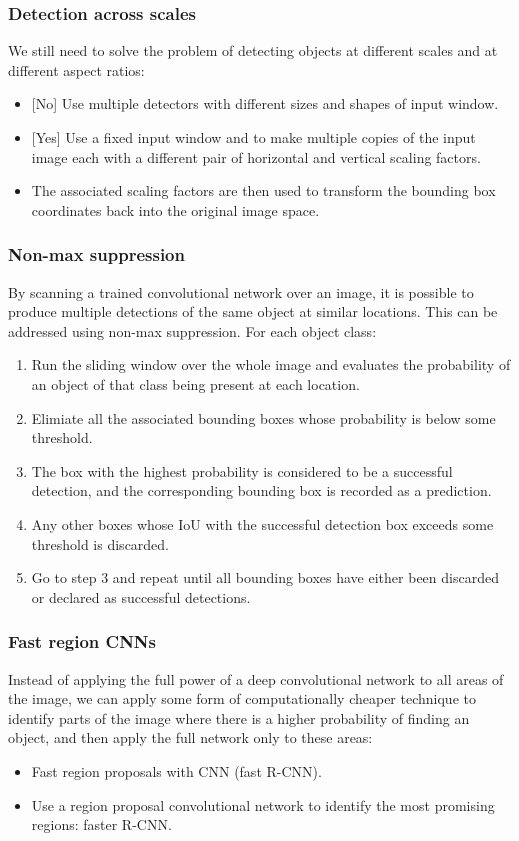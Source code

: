 \documentclass{beamer}
\begin{document}
\begin{frame}
    \frametitle{Detection across scales}
    We still need to solve the problem of detecting objects at different scales and at different aspect ratios:
    \begin{itemize}
        \item {[No]} Use multiple detectors with different sizes and shapes of input window.
        \item {[Yes]} Use a fixed input window and to make multiple copies of the input image each with a different pair of horizontal and vertical scaling factors.
        \item The associated scaling factors are then used to transform the bounding box coordinates back into the original image space.
    \end{itemize}
\end{frame}

\begin{frame}
    \frametitle{Non-max suppression}
    By scanning a trained convolutional network over an image, it is possible to produce multiple detections of the same object at similar locations. This can be addressed using non-max suppression. For each object class:
    \begin{enumerate}
        \item Run the sliding window over the whole image and evaluates the probability of an object of that class being present at each location.
        \item Elimiate all the associated bounding boxes whose probability is below some threshold.
        \item The box with the highest probability is considered to be a successful detection, and the corresponding bounding box is recorded as a prediction.
        \item Any other boxes whose IoU with the successful detection box exceeds some threshold is discarded.
        \item Go to step 3 and repeat until all bounding boxes have either been discarded or declared as successful detections.
    \end{enumerate}
\end{frame}

\begin{frame}
    \frametitle{Fast region CNNs}
    Instead of applying the full power of a deep convolutional network to all areas of the image, we can apply some form of computationally cheaper technique to identify parts of the image where there is a higher probability of finding an object, and then apply the full network only to these areas:
    \begin{itemize}
        \item Fast region proposals with CNN (fast R-CNN).
        \item Use a region proposal convolutional network to identify the most promising regions: faster R-CNN.
    \end{itemize}
\end{frame}
\end{document}

